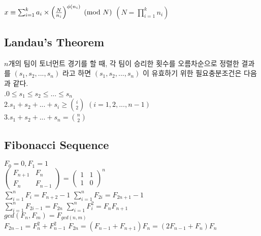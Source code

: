 \documentclass[10pt,landscape,a4paper,twocolumn]{article}
\begin{document}
\begin{large}
$x \equiv \sum_{i=1}^k {a_i\times{\left( {N \over n_i} \right)}^{\phi(n_i)}} \pmod{N}$ \hspace{1em} $\left( N = \prod_{i=1}^k {n_i} \right)$
\end{large}


\subsection{Landau's Theorem}
$n$개의 팀이 토너먼트 경기를 할 때, 각 팀이 승리한 횟수를 오름차순으로 정렬한 결과를 $(s_1,s_2, ... , s_n)$ 라고 하면 $(s_1,s_2, ... , s_n)$ 이 유효하기 위한 필요충분조건은 다음과 같다.\\
.\hspace{1em}$0 \le s_1 \le s_2 \le ... \le s_n$\\
2.\hspace{1em}$s_1+s_2+ ...+s_i \ge {i \choose 2}$ \hspace{1em}$(i=1,2,...,n-1)$\\
3.\hspace{1em}$s_1+s_2+ ...+s_n = {n \choose 2}$\\

\subsection{Fibonacci Sequence}
$F_0=0, F_1=1$\\

$
\begin{pmatrix}
    F_{n+1} & F_n \\
    F_n & F_{n-1}
\end{pmatrix}
$
=
$
\begin{pmatrix}
    1 & 1 \\
    1 & 0
\end{pmatrix}^n
$\\


$\sum_{i=1}^n F_i=F_{n+2}-1$
\hspace{10em}
$\sum_{i=1}^n F_{2i}=F_{2n+1}-1$\\

$\sum_{i=1}^n F_{2i-1}=F_{2n}$
\hspace{11em}
$\sum_{i=1}^n F_i^2=F_nF_{n+1}$\\

$gcd(F_n,F_m)=F_{gcd(n,m)}$\\

$F_{2n-1}=F_n^2+F_{n-1}^2$
\hspace{10em}
$F_{2n}=(F_{n-1}+F_{n+1})F_n=(2F_{n-1}+F_n)F_n$\\
\end{document}
